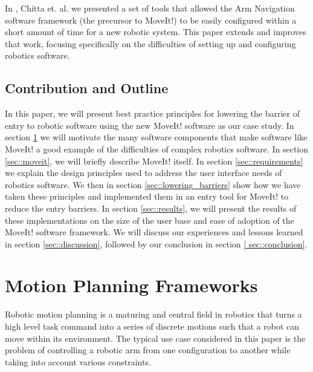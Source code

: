 \documentclass[10pt,journal,compsoc]{joser1}
\begin{document}
{In \cite{chitta2012perception}, Chitta et. al. we presented a set of tools that
allowed the Arm Navigation software framework (the precursor to MoveIt!) to be
easily configured within a short amount of time for a new robotic system. This
paper extends and improves that work, focusing specifically on the difficulties
of setting up and configuring robotics software.

\subsection{Contribution and Outline}

In this paper, we will present best practice principles for lowering the barrier
of entry to robotic software using the new MoveIt! software \cite{moveit} as our
case study. In section \ref{sec::motion_planning} we will motivate the many
software components that make software like MoveIt! a good example of the
difficulties of complex robotics software. In section \ref{sec::moveit}, we will
briefly describe MoveIt! itself. In section \ref{sec::requirements} we explain
the design principles used to address the user interface needs of robotics
software. We then in section \ref{sec::lowering_barriers} show how we have taken these principles and implemented them
in an entry tool for MoveIt! to reduce the entry barriers. In section \ref{sec::results}, we will present the
results of these implementations on the size of the user base and ease of
adoption of the MoveIt! software framework. We will discuss our experiences and
lessons learned in section \ref{sec::discussion}, followed by our conclusion in
section \ref{
sec::conclusion}.

\section{Motion Planning Frameworks}
\label{sec::motion_planning}

Robotic motion planning is a maturing and central field in robotics
\cite{moll2011teaching} that turns a high level task command into a series of
discrete motions such that a robot can move within its environment. The typical
use case considered in this paper is the problem of controlling a robotic arm
from one configuration to another while taking into account various constraints.

}
\end{document}
